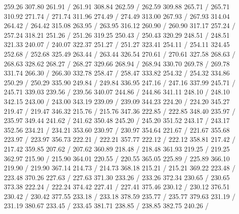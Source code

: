 { 259.26 307.80 261.91 /
 261.91 308.84 262.59 /
 262.59 309.88 265.71 /
 265.71 310.92 271.74 /
 271.74 311.96 274.49 /
 274.49 313.00 267.93 /
 267.93 314.04 264.42 /
 264.42 315.08 263.95 /
 263.95 316.12 260.90 /
 260.90 317.17 257.24 /
 257.24 318.21 251.26 /
 251.26 319.25 250.43 /
 250.43 320.29 248.51 /
 248.51 321.33 240.07 /
 240.07 322.37 251.27 /
 251.27 323.41 254.11 /
 254.11 324.45 252.68 /
 252.68 325.49 263.44 /
 263.44 326.54 270.61 /
 270.61 327.58 268.63 /
 268.63 328.62 268.27 /
 268.27 329.66 268.94 /
 268.94 330.70 269.78 /
 269.78 331.74 266.30 /
 266.30 332.78 258.47 /
 258.47 333.82 254.32 /
 254.32 334.86 250.29 /
 250.29 335.90 249.84 /
 249.84 336.95 247.16 /
 247.16 337.99 245.71 /
 245.71 339.03 239.56 /
 239.56 340.07 244.86 /
 244.86 341.11 248.10 /
 248.10 342.15 243.00 /
 243.00 343.19 239.09 /
 239.09 344.23 224.20 /
 224.20 345.27 219.47 /
 219.47 346.32 215.76 /
 215.76 347.36 222.85 /
 222.85 348.40 235.97 /
 235.97 349.44 241.62 /
 241.62 350.48 245.20 /
 245.20 351.52 243.17 /
 243.17 352.56 234.21 /
 234.21 353.60 230.97 /
 230.97 354.64 221.67 /
 221.67 355.68 223.97 /
 223.97 356.73 222.21 /
 222.21 357.77 222.12 /
 222.12 358.81 217.42 /
 217.42 359.85 207.62 /
 207.62 360.89 218.48 /
 218.48 361.93 219.25 /
 219.25 362.97 215.90 /
 215.90 364.01 220.55 /
 220.55 365.05 225.89 /
 225.89 366.10 219.90 /
 219.90 367.14 214.73 /
 214.73 368.18 215.21 /
 215.21 369.22 223.48 /
 223.48 370.26 227.63 /
 227.63 371.30 233.26 /
 233.26 372.34 230.65 /
 230.65 373.38 222.24 /
 222.24 374.42 227.41 /
 227.41 375.46 230.12 /
 230.12 376.51 230.42 /
 230.42 377.55 233.18 /
 233.18 378.59 235.77 /
 235.77 379.63 231.19 /
 231.19 380.67 233.45 /
 233.45 381.71 238.85 /
 238.85 382.75 240.26 /
}
